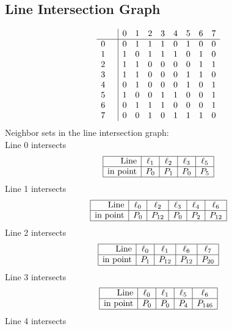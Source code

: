 \documentclass{article}
\begin{document}
{\subsection*{Line Intersection Graph}
{\arraycolsep=1pt
$$
\begin{array}{rr|*{8}r}
 &  & 0 & 1 & 2 & 3 & 4 & 5 & 6 & 7\\
\hline
0 &  & 0 & 1 & 1 & 1 & 0 & 1 & 0 & 0\\
1 &  & 1 & 0 & 1 & 1 & 1 & 0 & 1 & 0\\
2 &  & 1 & 1 & 0 & 0 & 0 & 0 & 1 & 1\\
3 &  & 1 & 1 & 0 & 0 & 0 & 1 & 1 & 0\\
4 &  & 0 & 1 & 0 & 0 & 0 & 1 & 0 & 1\\
5 &  & 1 & 0 & 0 & 1 & 1 & 0 & 0 & 1\\
6 &  & 0 & 1 & 1 & 1 & 0 & 0 & 0 & 1\\
7 &  & 0 & 0 & 1 & 0 & 1 & 1 & 1 & 0\\
\end{array}
$$
}%
Neighbor sets in the line intersection graph:\\
Line 0 intersects 
$$
\begin{array}{|r*{4}{|c}|}
\hline
\mbox{Line}  & \ell_{1} & \ell_{2} & \ell_{3} & \ell_{5}\\
\hline
\mbox{in point}  & P_{0} & P_{1} & P_{0} & P_{5}\\
\hline
\end{array}
$$
Line 1 intersects 
$$
\begin{array}{|r*{5}{|c}|}
\hline
\mbox{Line}  & \ell_{0} & \ell_{2} & \ell_{3} & \ell_{4} & \ell_{6}\\
\hline
\mbox{in point}  & P_{0} & P_{12} & P_{0} & P_{2} & P_{12}\\
\hline
\end{array}
$$
Line 2 intersects 
$$
\begin{array}{|r*{4}{|c}|}
\hline
\mbox{Line}  & \ell_{0} & \ell_{1} & \ell_{6} & \ell_{7}\\
\hline
\mbox{in point}  & P_{1} & P_{12} & P_{12} & P_{20}\\
\hline
\end{array}
$$
Line 3 intersects 
$$
\begin{array}{|r*{4}{|c}|}
\hline
\mbox{Line}  & \ell_{0} & \ell_{1} & \ell_{5} & \ell_{6}\\
\hline
\mbox{in point}  & P_{0} & P_{0} & P_{4} & P_{146}\\
\hline
\end{array}
$$
Line 4 intersects 
}
\end{document}

